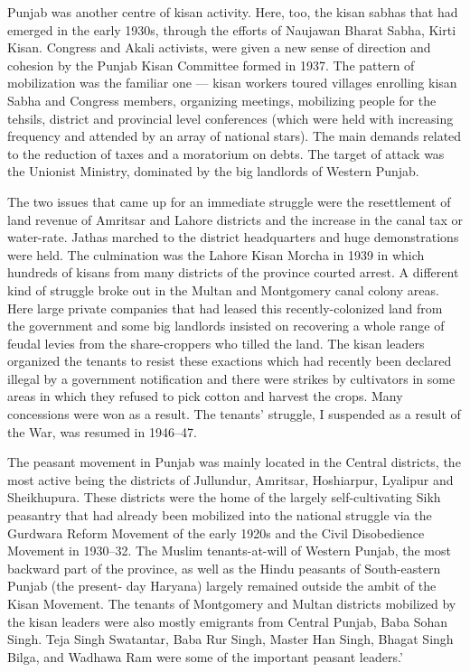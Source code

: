 \begin{multicols}{2}
Punjab was another centre of kisan activity. Here, too, the kisan sabhas that had emerged in the early 1930s, through the efforts of Naujawan Bharat Sabha, Kirti Kisan. Congress and Akali activists, were given a new sense of direction and cohesion by the Punjab Kisan Committee formed in 1937. The pattern of mobilization was the familiar one --- kisan workers toured villages enrolling kisan Sabha and Congress members, organizing meetings, mobilizing people for the tehsils, district and provincial level conferences (which were held with increasing frequency and attended by an array of national stars). The main demands related to the reduction of taxes and a moratorium on debts. The target of attack was the Unionist Ministry, dominated by the big landlords of Western Punjab.

The two issues that came up for an immediate struggle were the resettlement of land revenue of Amritsar and Lahore districts and the increase in the canal tax or water-rate. Jathas marched to the district headquarters and huge demonstrations were held. The culmination was the Lahore Kisan Morcha in 1939 in which hundreds of kisans from many districts of the province courted arrest. A different kind of struggle broke out in the Multan and Montgomery canal colony areas. Here large private companies that had leased this recently-colonized land from the government and some big landlords insisted on recovering a whole range of feudal levies from the share-croppers who tilled the land. The kisan leaders organized the tenants to resist these exactions which had recently been declared illegal by a government notification and there were strikes by cultivators in some areas in which they refused to pick cotton and harvest the crops. Many concessions were won as a result. The tenants' struggle, I suspended as a result of the War, was resumed in 1946--47.

The peasant movement in Punjab was mainly located in the Central districts, the most active being the districts of Jullundur, Amritsar, Hoshiarpur, Lyalipur and Sheikhupura. These districts were the home of the largely self-cultivating Sikh peasantry that had already been mobilized into the national struggle via the Gurdwara Reform Movement of the early 1920s and the Civil Disobedience Movement in 1930--32. The Muslim tenants-at-will of Western Punjab, the most backward part of the province, as well as the Hindu peasants of South-eastern Punjab (the present- day Haryana) largely remained outside the ambit of the Kisan Movement. The tenants of Montgomery and Multan districts mobilized by the kisan leaders were also mostly emigrants from Central Punjab, Baba Sohan Singh. Teja Singh Swatantar, Baba Rur Singh, Master Han Singh, Bhagat Singh Bilga, and Wadhawa Ram were some of the important peasant leaders.'


\end{multicols}
